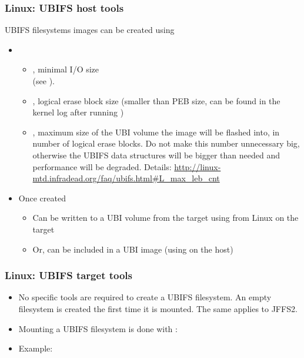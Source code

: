\begin{frame}
  \frametitle{Linux: UBIFS host tools}
  UBIFS filesystems images can be created using 
    \begin{itemize}
    \item {}
      \begin{itemize}
      \item {}, minimal I/O size\\
                 (see ).
      \item {}, logical erase block size (smaller than
                 PEB size, can be found in the kernel log after running
 		 )
      \item {}, maximum size of the UBI volume the image
        will be flashed into, in number of logical erase blocks.
        Do not make this number unnecessary big, otherwise the UBIFS
        data structures will be bigger than needed and performance
        will be degraded. Details:
        {\scriptsize\url{http://linux-mtd.infradead.org/faq/ubifs.html\#L_max_leb_cnt}}
      \end{itemize}
    \item Once created
      \begin{itemize}
      \item Can be written to a UBI volume from the target using
         from Linux on the target
      \item Or, can be included in a UBI image (using 
        on the host)
      \end{itemize}
    \end{itemize}
\end{frame}

\begin{frame}
  \frametitle{Linux: UBIFS target tools}
  \begin{itemize}
  \item No specific tools are required to create a UBIFS filesystem.
	An empty filesystem is created the first time it is mounted.
        The same applies to JFFS2.
  \item Mounting a UBIFS filesystem is done with :\\
  \item Example:\\
  \end{itemize}
\end{frame}

